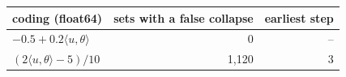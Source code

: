 \begin{tabular}{lrr}
\toprule
coding (float64) & sets with a false collapse & earliest step\\
\midrule
$-0.5+0.2\langle u,\theta\rangle$ & 0 & --\\
$(2\langle u,\theta\rangle-5)/10$ & 1{,}120 & 3\\
\bottomrule
\end{tabular}
